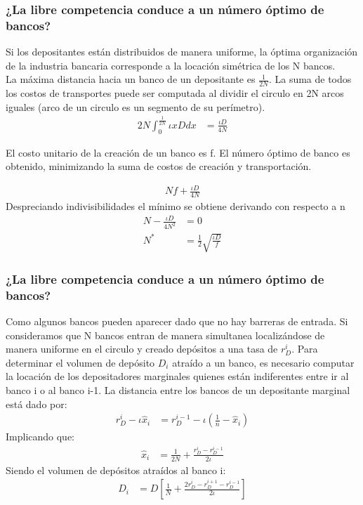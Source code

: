 \begin{frame}
    \frametitle{{\normalsize ¿La libre competencia conduce a un número óptimo de bancos?} {}}
 {\footnotesize Si los depositantes están distribuidos de manera uniforme, la óptima organización de la industria bancaria corresponde a la locación simétrica de los N bancos.\\
 La máxima distancia hacia un banco de un depositante es  $\frac{1}{2N}$. La suma de todos los costos de transportes puede ser computada al dividir el circulo en 2N arcos iguales (arco de un circulo es un segmento de su perímetro).  
   \begin{align}
  2N\int_{0}^{\frac{1}{2N}}\iota xDdx&=\frac{\iota D}{4N}
  \end{align}  
    
  El costo unitario de la creación de un banco es f. El número óptimo de banco es obtenido, minimizando la suma de costos de creación y transportación.
  
   \begin{align}
  Nf+\frac{\iota D}{4N}
  \end{align}  
  Despreciando indivisibilidades el mínimo se obtiene derivando con respecto a n
  \begin{align}
  N-\frac{\iota D}{4N^{2}}&=0 \nonumber\\
  N^{*}&=\frac{1}{2}\sqrt{\frac{\iota D}{f}}
  \end{align}  }
\end{frame}



\begin{frame}
    \frametitle{{\normalsize ¿La libre competencia conduce a un número óptimo de bancos?} {}}
   {\footnotesize  Como algunos bancos pueden aparecer dado que no hay barreras de entrada. Si consideramos que N bancos entran de manera simultanea localizándose de manera uniforme en el circulo y creado depósitos a una tasa de $r_{D}^{i}$. Para determinar el volumen de depósito $D_{i}$ atraído a un banco, es necesario computar la locación de los depositadores marginales quienes están indiferentes entre ir al banco i o al banco i-1. La distancia entre los bancos de un depositante marginal está dado por:
     \begin{align}
   r_{D}^{i}-\iota\hat{x}_{i}&=r_{D}^{i-1}-\iota \left( \frac{1}{n}-\hat{x}_{i}\right) 
    \end{align}  
    Implicando que:
    \begin{align}
   \hat{x}_{i}&=\frac{1}{2N}+\frac{r_{D}^{i}-r_{D}^{i-1}}{2\iota}\nonumber
    \end{align}  
    Siendo el volumen de depósitos atraídos al banco i:
    \begin{align}
    D_{i}&=D\left[\frac{1}{N}+\frac{2r_{D}^{i}-r_{D}^{i+1}-r_{D}^{i-1}}{2\iota} \right] \nonumber
    \end{align} } 
    
\end{frame}

